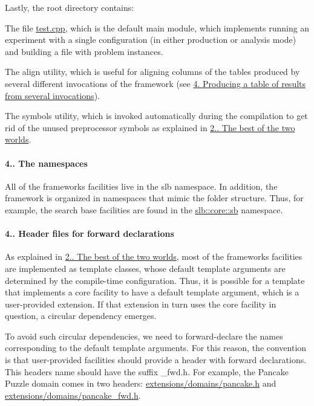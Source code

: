 Lastly, the root directory contains\+:
\begin{DoxyItemize}
\item The file \hyperlink{test_8cpp}{test.\+cpp}, which is the default main module, which implements running an experiment with a single configuration (in either production or analysis mode) and building a file with problem instances.
\item The {\ttfamily align} utility, which is useful for aligning columns of the tables produced by several different invocations of the framework (see \hyperlink{index_s-single}{4. Producing a table of results from several invocations}).
\item The {\ttfamily symbols} utility, which is invoked automatically during the compilation to get rid of the unused preprocessor symbols as explained in \hyperlink{index_s-configuration}{2.. The best of the two worlds}.
\end{DoxyItemize}\hypertarget{index_s-namespace}{}\paragraph{4.. The namespaces}\label{index_s-namespace}
All of the framework\textquotesingle{}s facilities live in the {\ttfamily slb} namespace. In addition, the framework is organized in namespaces that mimic the folder structure. Thus, for example, the search base facilities are found in the \hyperlink{namespaceslb_1_1core_1_1sb}{slb\+::core\+::sb} namespace.\hypertarget{index_s-forward}{}\paragraph{4.. Header files for forward declarations}\label{index_s-forward}
As explained in \hyperlink{index_s-configuration}{2.. The best of the two worlds}, most of the framework\textquotesingle{}s facilities are implemented as template classes, whose default template arguments are determined by the compile-\/time configuration. Thus, it is possible for a template that implements a core facility to have a default template argument, which is a user-\/provided extension. If that extension in turn uses the core facility in question, a circular dependency emerges.

To avoid such circular dependencies, we need to forward-\/declare the names corresponding to the default template arguments. For this reason, the convention is that user-\/provided facilities should provide a header with forward declarations. This header\textquotesingle{}s name should have the suffix {\ttfamily \+\_\+fwd.\+h}. For example, the Pancake Puzzle domain comes in two headers\+: {\ttfamily \hyperlink{pancake_8h}{extensions/domains/pancake.\+h}} and {\ttfamily \hyperlink{pancake__fwd_8h}{extensions/domains/pancake\+\_\+fwd.\+h}}.

